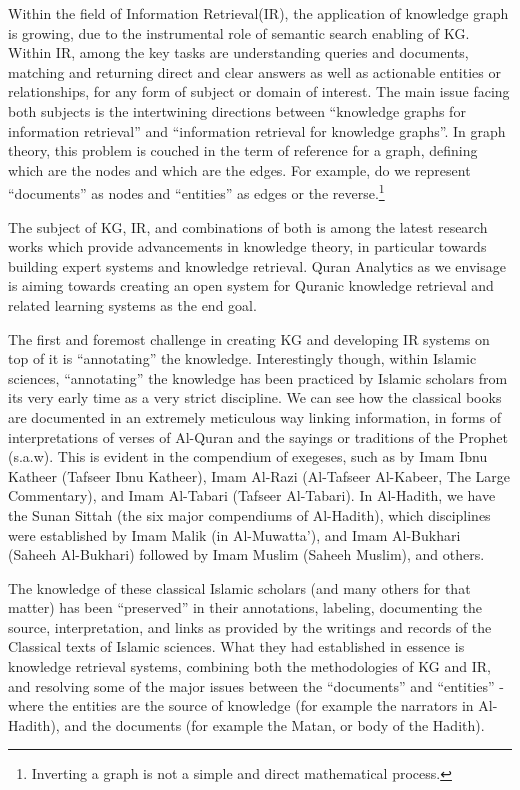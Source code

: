 \documentclass[
]{article}
\begin{document}
Within the field of Information Retrieval(IR), the application of knowledge graph is growing, due to the instrumental role of semantic search enabling of KG. Within IR, among the key tasks are understanding queries and documents, matching and returning direct and clear answers as well as actionable entities or relationships, for any form of subject or domain of interest. The main issue facing both subjects is the intertwining directions between ``knowledge graphs for information retrieval'' and ``information retrieval for knowledge graphs''\citep{reinada2020}. In graph theory, this problem is couched in the term of reference for a graph, defining which are the nodes and which are the edges. For example, do we represent ``documents'' as nodes and ``entities'' as edges or the reverse.\footnote{Inverting a graph is not a simple and direct mathematical process.}

The subject of KG, IR, and combinations of both is among the latest research works which provide advancements in knowledge theory, in particular towards building expert systems and knowledge retrieval. Quran Analytics as we envisage is aiming towards creating an open system for Quranic knowledge retrieval and related learning systems as the end goal.

The first and foremost challenge in creating KG and developing IR systems on top of it is ``annotating'' the knowledge. Interestingly though, within Islamic sciences, ``annotating'' the knowledge has been practiced by Islamic scholars from its very early time as a very strict discipline. We can see how the classical books are documented in an extremely meticulous way linking information, in forms of interpretations of verses of Al-Quran and the sayings or traditions of the Prophet (s.a.w). This is evident in the compendium of exegeses, such as by Imam Ibnu Katheer (Tafseer Ibnu Katheer), Imam Al-Razi (Al-Tafseer Al-Kabeer, The Large Commentary), and Imam Al-Tabari (Tafseer Al-Tabari). In Al-Hadith, we have the Sunan Sittah (the six major compendiums of Al-Hadith), which disciplines were established by Imam Malik (in Al-Muwatta'), and Imam Al-Bukhari (Saheeh Al-Bukhari) followed by Imam Muslim (Saheeh Muslim), and others.

The knowledge of these classical Islamic scholars (and many others for that matter) has been ``preserved'' in their annotations, labeling, documenting the source, interpretation, and links as provided by the writings and records of the Classical texts of Islamic sciences. What they had established in essence is knowledge retrieval systems, combining both the methodologies of KG and IR, and resolving some of the major issues between the ``documents'' and ``entities'' - where the entities are the source of knowledge (for example the narrators in Al-Hadith), and the documents (for example the Matan, or body of the Hadith).
\end{document}
